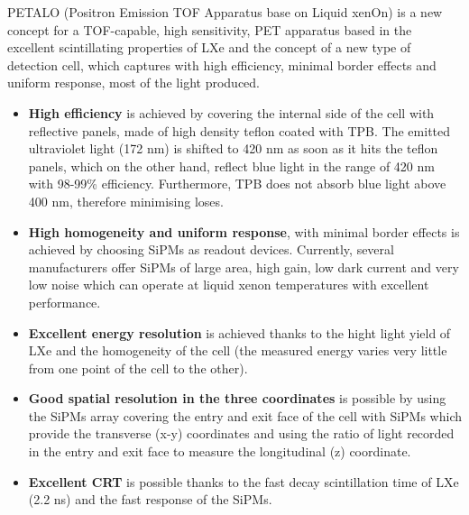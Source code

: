 
PETALO (Positron Emission TOF Apparatus base on Liquid xenOn) is a new concept for a TOF-capable, high sensitivity, PET apparatus based in the excellent scintillating properties of LXe and the concept of a new type of detection cell, which captures with high efficiency, minimal border effects and uniform response, most of the light produced.
 
\begin{itemize} 
\item {\bf High efficiency} is achieved by covering the internal side of the cell with reflective panels, made of high density teflon coated with TPB. The emitted ultraviolet light (172 nm) is shifted to 420 nm as soon as it hits the teflon panels, which on the other hand, reflect blue light in the range of 420 nm with 98-99\% efficiency. Furthermore, TPB does not absorb blue light above 400 nm, therefore minimising loses. 
\item {\bf High homogeneity and uniform response}, with minimal border effects is achieved by choosing SiPMs as readout devices. Currently, several manufacturers offer SiPMs of large area, high gain, low dark current and very low noise which can operate at liquid xenon temperatures with excellent performance.  
\item {\bf Excellent energy resolution} is achieved thanks to the hight light yield of LXe and the homogeneity of the cell (the measured energy varies very little from one point of the cell to the other).  
\item {\bf Good spatial resolution in the three coordinates} is possible by using the SiPMs array covering the entry and exit face of the cell with SiPMs which provide the transverse (x-y) coordinates and using the ratio of light recorded in the entry and exit face to measure the longitudinal (z) coordinate. 
\item {\bf Excellent CRT} is possible thanks to the fast decay scintillation time of LXe (2.2 ns) and the fast response of the SiPMs.  
\end{itemize} 
